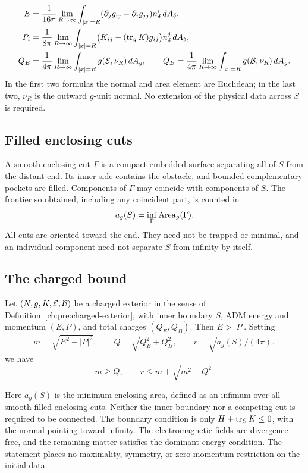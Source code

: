 \begin{definition}
\begin{align}
 E&=\frac1{16\pi}\lim_{R\to\infty}
 \int_{|x|=R}(\partial_jg_{ij}-\partial_ig_{jj})n_\delta^i\,dA_\delta,
 \label{ch:pre:adm-energy}\\
 P_i&=\frac1{8\pi}\lim_{R\to\infty}
 \int_{|x|=R}\bigl(K_{ij}-(\operatorname{tr}_gK)g_{ij}\bigr)n_\delta^j\,dA_\delta,
 \label{ch:pre:adm-momentum}\\
 Q_E&=\frac1{4\pi}\lim_{R\to\infty}
 \int_{|x|=R}g(\mathcal E,\nu_R)\,dA_g,
 \qquad
 Q_B=\frac1{4\pi}\lim_{R\to\infty}
 \int_{|x|=R}g(\mathcal B,\nu_R)\,dA_g.
 \label{ch:pre:charges}
\end{align}
In the first two formulas the normal and area element are Euclidean; in the last two, $\nu_R$ is the outward $g$-unit normal. No extension of the physical data across $S$ is required.
\end{definition}

\subsection{Filled enclosing cuts}

A smooth enclosing cut $\Gamma$ is a compact embedded surface separating all of $S$ from the distant end. Its inner side contains the obstacle, and bounded complementary pockets are filled. Components of $\Gamma$ may coincide with components of $S$. The frontier so obtained, including any coincident part, is counted in
\begin{equation}\label{ch:pre:area-infimum}
 a_g(S)=\inf_{\Gamma}\operatorname{Area}_g(\Gamma).
\end{equation}
All cuts are oriented toward the end. They need not be trapped or minimal, and an individual component need not separate $S$ from infinity by itself.

\subsection{The charged bound}

\begin{theorem}\label{ch:intro:main}
Let $(N,g,K,\mathcal E,\mathcal B)$ be a charged exterior in the sense of Definition~\ref{ch:pre:charged-exterior}, with inner boundary $S$, ADM energy and momentum $(E,P)$, and total charges $(Q_E,Q_B)$. Then $E>|P|$. Setting
\[
 m=\sqrt{E^2-|P|^2},\qquad
 Q=\sqrt{Q_E^2+Q_B^2},\qquad
 r=\sqrt{a_g(S)/(4\pi)},
\]
we have
\[
 m\ge Q,\qquad r\le m+\sqrt{m^2-Q^2}.
\]
\end{theorem}

Here $a_g(S)$ is the minimum enclosing area, defined as an infimum over all smooth filled enclosing cuts. Neither the inner boundary nor a competing cut is required to be connected. The boundary condition is only $H+\operatorname{tr}_S K\le0$, with the normal pointing toward infinity. The electromagnetic fields are divergence free, and the remaining matter satisfies the dominant energy condition. The statement places no maximality, symmetry, or zero-momentum restriction on the initial data.


